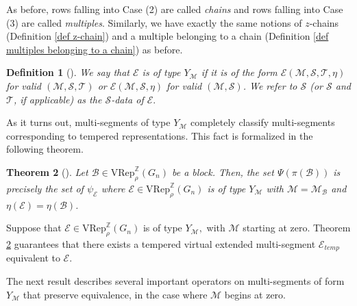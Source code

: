 \documentclass[11pt,letterpaper]{amsart}
\newcommand{\VRep}{{\mathrm{VRep}}}
\newcommand{\BB}{\mathcal{B}}
\newcommand{\EE}{\mathcal{E}}
\newtheorem{thm}{Theorem}[section]
\newtheorem{defn}[thm]{Definition}
\numberwithin{equation}{section}
\begin{document}
As before,  rows falling into Case (2) are called \emph{chains} and rows falling into Case (3) are called \emph{multiples}. Similarly, we have exactly the same notions of $z$-chains (Definition \ref{def z-chain}) and a multiple belonging to a chain (Definition \ref{def multiples belonging to a chain}) as before. 


\begin{defn}[{\cite[Definition 5.12]{HKT26}}]\label{defn type Y M}
    We say that $\EE$ is of \emph{type $Y_\mathcal{M}$} if it is of the form $\EE(\mathcal{M}, \mathcal{S}, \mathcal{T}, \eta)$ for valid $(\mathcal{M}, \mathcal{S}, \mathcal{T})$ or $\EE(\mathcal{M}, \mathcal{S}, \eta)$ for valid $(\mathcal{M}, \mathcal{S})$. We refer to $\mathcal{S}$ (or $\mathcal{S}$ and $\mathcal{T}$, if applicable) as the \emph{$\mathcal{S}$-data} of $\EE.$
\end{defn}

As it turns out, multi-segments of type $Y_\mathcal{M}$ completely classify multi-segments corresponding to tempered representations. This fact is formalized in the following theorem.

\begin{thm}[{\cite[Theorem 5.17]{HKT26}}]
\label{block classification}
    Let $\mathcal{B} \in\VRep_\rho^\mathbb{Z}(G_n)$ be a block. Then, the set $\Psi(\pi(\BB))$ is precisely the set of $\psi_\EE$ where $\EE\in\VRep_\rho^\mathbb{Z}(G_n)$ is of type $Y_\mathcal{M}$ with $\mathcal{M} = \mathcal{M}_\BB$ and $\eta(\EE)=\eta(\BB)$.
\end{thm}



Suppose that $\EE\in\VRep_\rho^\mathbb{Z}(G_n)$ is of type $Y_\mathcal{M},$ with $\mathcal{M}$ starting at zero.
    Theorem \ref{block classification} guarantees that there exists a tempered virtual extended multi-segment $\EE_{temp}$ equivalent to $\EE.$

    The next result describes several important operators on multi-segments of form $Y_\mathcal{M}$ that preserve equivalence, in the case where $\mathcal{M}$ begins at zero.
\end{document}
